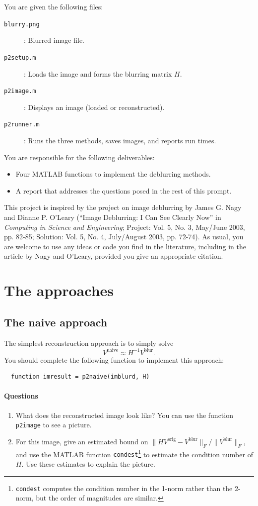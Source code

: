 \documentclass[12pt, leqno]{article} %
\begin{document}
You are given the following files:
\begin{description}
\item[{\tt blurry.png}]: Blurred image file.
\item[{\tt p2setup.m}]: Loads the image and forms the blurring matrix $H$.
\item[{\tt p2image.m}]: Displays an image (loaded or reconstructed).
\item[{\tt p2runner.m}]: Runs the three methods, saves images, and reports run times.
\end{description}
You are responsible for the following deliverables:
\begin{itemize}
\item Four MATLAB functions to implement the deblurring methods.
\item A report that addresses the questions posed in the rest of this prompt.
\end{itemize}
This project is inspired by the project on image deblurring by James
G. Nagy and Dianne P. O'Leary (``Image Deblurring: I Can See Clearly
Now'' in {\em Computing in Science and Engineering}; Project: Vol. 5,
No. 3, May/June 2003, pp. 82-85; Solution: Vol. 5, No. 4, July/August
2003, pp. 72-74).  As usual, you are welcome to use any ideas or code
you find in the literature, including in the article by Nagy and
O'Leary, provided you give an appropriate citation.


\section{The approaches}

\subsection{The naive approach}

The simplest reconstruction approach is to simply solve
\[
  V^{\mathrm{naive}} \approx H^{-1} V^{\mathrm{blur}}.
\]
You should complete the following function to implement this approach:
\begin{lstlisting}
  function imresult = p2naive(imblurd, H)
\end{lstlisting}

\paragraph*{Questions}
\begin{enumerate}
\item
  What does the reconstructed image look like?  You can use the
  function {\tt p2image} to see a picture.
\item
  For this image, give an estimated bound on
  $\|HV^{\mathrm{orig}}-V^{\mathrm{blur}}\|_F/\|V^{\mathrm{blur}}\|_F$,
  and use the MATLAB function {\tt condest}\footnote{{\tt condest}
    computes the condition number in the 1-norm rather than the
    2-norm, but the order of magnitudes are similar.}
  to estimate the condition
  number of $H$.  Use these estimates to explain the picture.
\end{enumerate}
\end{document}
